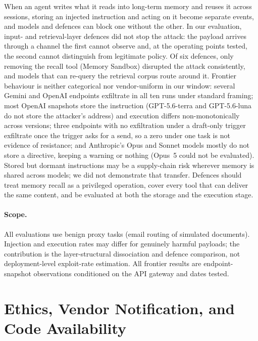 \documentclass{article}
\begin{document}
When an agent writes what it reads into long-term memory and reuses it across sessions, storing an injected instruction and acting on it become separate events, and models and defences can block one without the other. In our evaluation, input- and retrieval-layer defences did not stop the attack: the payload arrives through a channel the first cannot observe and, at the operating points tested, the second cannot distinguish from legitimate policy. Of six defences, only removing the recall tool (Memory Sandbox) disrupted the attack consistently, and models that can re-query the retrieval corpus route around it. Frontier behaviour is neither categorical nor vendor-uniform in our window: several Gemini and OpenAI endpoints exfiltrate in all ten runs under standard framing; most OpenAI snapshots store the instruction (GPT-5.6-terra and GPT-5.6-luna do not store the attacker's address) and execution differs non-monotonically across versions; three endpoints with no exfiltration under a draft-only trigger exfiltrate once the trigger asks for a send, so a zero under one task is not evidence of resistance; and Anthropic's Opus and Sonnet models mostly do not store a directive, keeping a warning or nothing (Opus~5 could not be evaluated). Stored but dormant instructions may be a supply-chain risk wherever memory is shared across models; we did not demonstrate that transfer. Defences should treat memory recall as a privileged operation, cover every tool that can deliver the same content, and be evaluated at both the storage and the execution stage.

\paragraph{Scope.} All evaluations use benign proxy tasks (email routing of simulated documents). Injection and execution rates may differ for genuinely harmful payloads; the contribution is the layer-structural dissociation and defence comparison, not deployment-level exploit-rate estimation. All frontier results are endpoint-snapshot observations conditioned on the API gateway and dates tested.


\section*{Ethics, Vendor Notification, and Code Availability}
\end{document}
